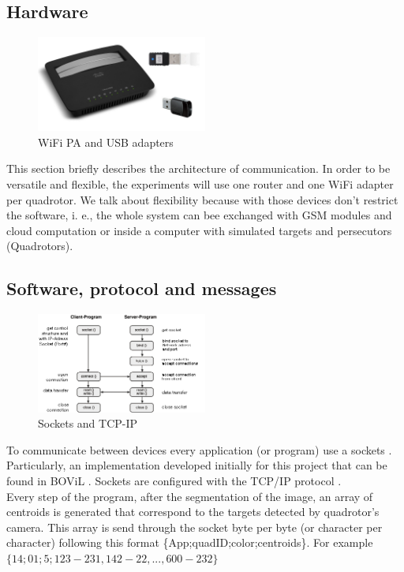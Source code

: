 \subsection{Hardware}
\begin{figure}
	\includegraphics[width=0.5\textwidth]{../Images/c2/hardware_comm.jpg}
	\caption{WiFi PA and USB adapters}
	\label{fig:hardwareComm}
\end{figure}

This section briefly describes the architecture of communication. In order to be versatile and flexible, the experiments will use one router and one WiFi adapter per quadrotor. We talk about flexibility because with those devices don't restrict the software, i. e., the whole system can bee exchanged with GSM modules and cloud computation or inside a computer with simulated targets and persecutors (Quadrotors).

\subsection{Software, protocol and messages}

\begin{figure}
	\begin{center}
		\includegraphics[width=0.5\textwidth, natwidth=448, natheight=263]{../Images/c2/socketstcpip.png}
	\end{center}
	\caption{Sockets and TCP-IP}
	\label{fig:socketstcpip}
\end{figure}

To communicate between devices every application (or program) use a sockets \cite{SocketWiki}. Particularly, an implementation developed initially for this project that can be found in BOViL \cite{BOViL}. Sockets are configured with the TCP/IP protocol \cite{TCPIP}. \\
Every step of the program, after the segmentation of the image, an array of centroids is generated that correspond to the targets detected by quadrotor's camera. This array is send through the socket byte per byte (or character per character) following this format \{App;quadID;color;centroids\}. For example $\{14;01;5;123-231,142-22,...,600-232\}$

